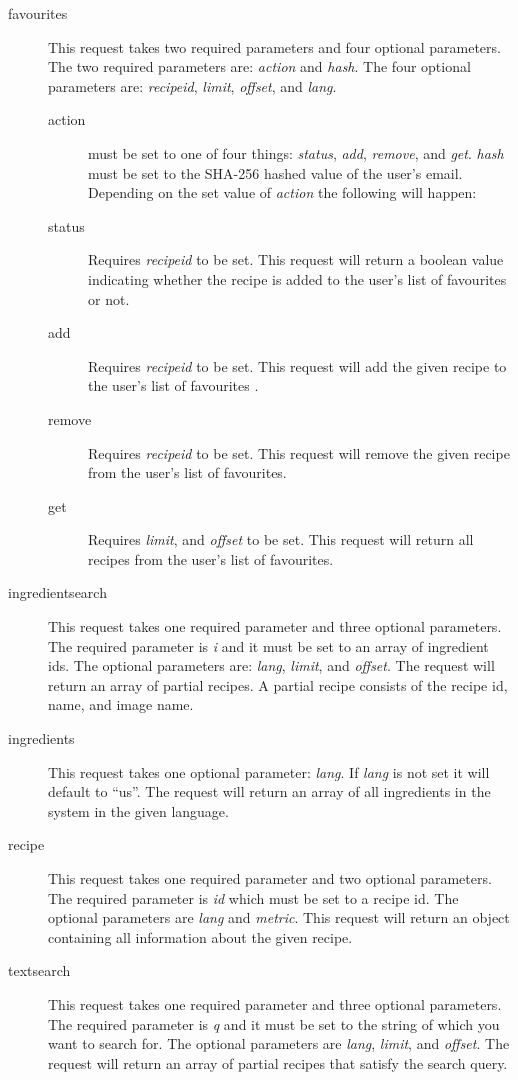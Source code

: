 \begin{description}
\item[favourites] This request takes two required parameters and four optional parameters. The two required parameters are: \textit{action} and \textit{hash}. The four optional parameters are: \textit{recipeid}, \textit{limit}, \textit{offset}, and \textit{lang}.

\begin{description}
\item[action] must be set to one of four things: \textit{status}, \textit{add}, \textit{remove}, and \textit{get}. \textit{hash} must be set to the SHA-256 hashed value of the user's email.
Depending on the set value of \textit{action} the following will happen:
\item[status] Requires \textit{recipeid} to be set. This request will return a boolean value indicating whether the recipe is added to the user's list of favourites or not.
\item[add] Requires \textit{recipeid} to be set. This request will add the given recipe to the user's list of favourites .
\item[remove] Requires \textit{recipeid} to be set. This request will remove the given recipe from the user's list of favourites.
\item[get] Requires \textit{limit}, and \textit{offset} to be set. This request will return all recipes from the user's list of favourites.
\end{description}

\item[ingredientsearch] This request takes one required parameter and three optional parameters. The required parameter is \textit{i} and it must be set to an array of ingredient ids. The optional parameters are: \textit{lang}, \textit{limit}, and \textit{offset}. The request will return an array of partial recipes. A partial recipe consists of the recipe id, name, and image name.
\item[ingredients] This request takes one optional parameter: \textit{lang}. If \textit{lang} is not set it will default to ``us''. The request will return an array of all ingredients in the system in the given language.
\item[recipe] This request takes one required parameter and two optional parameters. The required parameter is \textit{id} which must be set to a recipe id. The optional parameters are \textit{lang} and \textit{metric}. This request will return an object containing all information about the given recipe.
\item[textsearch] This request takes one required parameter and three optional parameters. The required parameter is \textit{q} and it must be set to the string of which you want to search for. The optional parameters are \textit{lang}, \textit{limit}, and \textit{offset}. The request will return an array of partial recipes that satisfy the search query.
\end{description}



